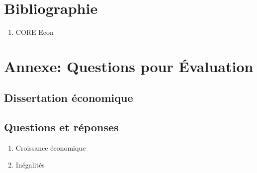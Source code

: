 \documentclass[11pt]{amsart}
\begin{document}
\hypertarget{x-bibliographie}{\section*{Bibliographie}}
\begin{enumerate}

\item{CORE Econ}

\end{enumerate}


\hypertarget{x-annexe:-questions-pour-évaluation}{\section*{Annexe: Questions pour Évaluation}}
\hypertarget{x-dissertation-économique}{\subsection*{Dissertation économique}}

\hypertarget{x-questions-et-réponses}{\subsection*{Questions et réponses}}
\begin{enumerate}

\item{Croissance économique}

\item{Inégalités}

\end{enumerate}
\end{document}
